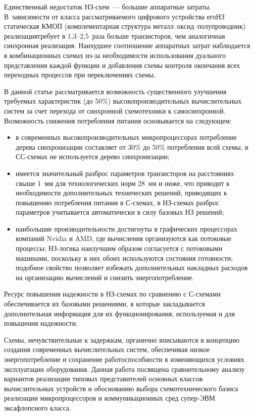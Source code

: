 \begin{multicols}{2}
       Единственный недостаток НЗ-схем~--- большие аппаратные затраты. 
В~зависимости от класса рассматриваемого цифрового устройства его\linebreak НЗ статическая 
КМОП (комплементарная структура ме\-талл--ок\-сид--по\-лу\-про\-вод\-ник)
реализация\linebreak тре\-бует в 1,3--2,5~раза больше транзисторов, чем аналогичная 
синхронная реализация. Наихудшее соотноше\-ние аппаратных затрат наблюдается в 
комбинационных схемах из-за необходимости использования дуального представления 
каждой функции и добавления схемы контроля окончания всех переходных процессов при 
переключениях схемы.
       
       В данной статье рассматривается возможность существенного улучшения требуемых 
характеристик (до 50\%) высокопроизводительных вычислительных систем за счет перехода 
от синхронной схемотехники к самосинхронной. Возможность снижения потребления 
питания основывается на следующем:
       \begin{itemize}
       \item в современных высокопроизводительных мик\-ро\-процессорах потребление 
дерева синхронизации составляет от 30\% до 50\% потребления всей схемы, в СС-схе\-мах не 
используется дерево синхронизации;
       \item имеется значительный разброс параметров транзисторов на расстояниях свыше 
1~мм для технологических норм 28~нм и ниже, что приводит к необходимости 
дополнительных технических решений, приводящих к повышению потребления питания в 
С-схе\-мах, в НЗ-схе\-мах разброс параметров учитывается автоматически в силу 
базовых НЗ решений;
       \item наибольшие производительности достигнуты в графических процессорах 
компаний Nvidia и AMD, где вычисления организуются как потоковые процессы; 
       НЗ-ло\-ги\-ка наилучшим образом согласуется с потоковыми машинами, поскольку  
в них обоих используются состояния готовности; подобное свойство позволяет избежать 
дополнительных накладных расходов на организацию вычислений и снизить 
энергопотребление.
       \end{itemize}
       
       Ресурс повышения надежности в НЗ-схе\-мах по сравнению с С-схе\-ма\-ми 
обеспечивается их базовыми решениями, в которые закладывается дополнительная 
информация для их функционирования, используемая и для повышения надежности.
       
Схемы, нечувствительные к задержкам, органично вписываются в концепцию создания современных 
вычислительных сис\-тем, обеспечивая \mbox{низкое} энергопотребление и сохранение 
работоспособности в изменяющихся условиях эксплуатации оборудования. Данная работа 
посвящена сравнительному анализу вариантов реализации типовых представителей 
основных классов вычислительных устройств и обоснованию выбора схемотехнического 
базиса реализации мик\-ро\-про\-цес\-со\-ров и коммуникационных сред су\-пер-ЭВМ 
эксафлопсного класса.


\end{multicols}
